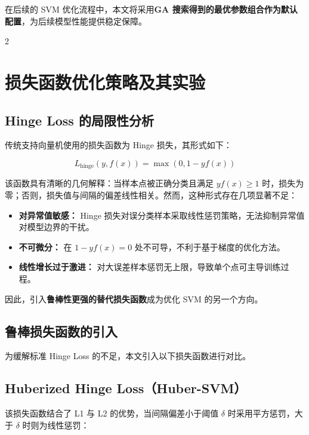 \documentclass[twoside,dvipsnames]{CUGThesis}
\begin{document}
在后续的 SVM 优化流程中，本文将采用\textbf{GA 搜索得到的最优参数组合作为默认配置}，为后续模型性能提供稳定保障。



        
        

        
        \newpage
        \begin{spacing}{2}
		\section{损失函数优化策略及其实验}
	\end{spacing}

    
\subsection{Hinge Loss 的局限性分析}

传统支持向量机使用的损失函数为 Hinge 损失，其形式如下：

\[
L_{\text{hinge}}(y, f(x)) = \max(0, 1 - y f(x))
\]

该函数具有清晰的几何解释：当样本点被正确分类且满足 \( y f(x) \geq 1 \) 时，损失为零；否则，损失值与间隔的偏差线性相关。然而，这种形式存在几项显著不足：

\begin{itemize}
    \item \textbf{对异常值敏感：} Hinge 损失对误分类样本采取线性惩罚策略，无法抑制异常值对模型边界的干扰。
    \item \textbf{不可微分：} 在 \( 1 - y f(x) = 0 \) 处不可导，不利于基于梯度的优化方法。
    \item \textbf{线性增长过于激进：} 对大误差样本惩罚无上限，导致单个点可主导训练过程。
\end{itemize}

因此，引入\textbf{鲁棒性更强的替代损失函数}成为优化 SVM 的另一个方向。

\subsection{鲁棒损失函数的引入}

为缓解标准 Hinge Loss 的不足，本文引入以下损失函数进行对比。

\subsection{Huberized Hinge Loss（Huber-SVM）}

该损失函数结合了 L1 与 L2 的优势，当间隔偏差小于阈值 \( \delta \) 时采用平方惩罚，大于 \( \delta \) 时则为线性惩罚：
\end{document}
